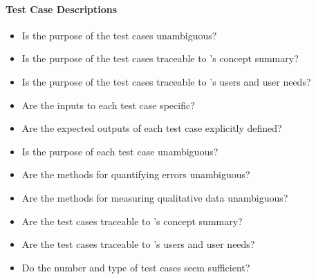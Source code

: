 \paragraph{Test Case Descriptions}
\begin{itemize}

    \item Is the purpose of the test cases unambiguous?

    \item Is the purpose of the test cases traceable to \progname{}'s concept
    summary?

    \item Is the purpose of the test cases traceable to \progname{}'s users and
    user needs?

    \item Are the inputs to each test case specific?

    \item Are the expected outputs of each test case explicitly defined?

    \item Is the purpose of each test case unambiguous?

    \item Are the methods for quantifying errors unambiguous?

    \item Are the methods for measuring qualitative data unambiguous?

    \item Are the test cases traceable to \progname{}'s concept summary?

    \item Are the test cases traceable to \progname{}'s users and user needs?

    \item Do the number and type of test cases seem sufficient?

\end{itemize}

